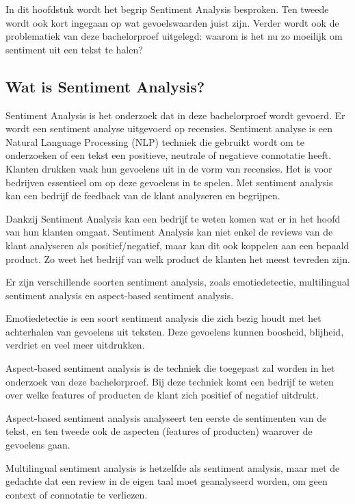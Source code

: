 In dit hoofdstuk wordt het begrip Sentiment Analysis besproken. Ten tweede wordt ook kort ingegaan op wat gevoelswaarden juist zijn. Verder wordt ook de problematiek van deze bachelorproef uitgelegd: waarom is het nu zo moeilijk om sentiment uit een tekst te halen?  

\subsection{Wat is Sentiment Analysis?}
\label{sec:watissentimentanalysis}

Sentiment Analysis is het onderzoek dat in deze bachelorproef wordt gevoerd. Er wordt een sentiment analyse uitgevoerd op recensies. Sentiment analyse is een Natural Language Processing (NLP) techniek die gebruikt wordt om te onderzoeken of een tekst een positieve, neutrale of negatieve connotatie heeft. Klanten drukken vaak hun gevoelens uit in de vorm van recensies. Het is voor bedrijven essentieel om op deze gevoelens in te spelen. Met sentiment analysis kan een bedrijf de feedback van de klant analyseren en begrijpen. \autocite{MonkeyLearn2021}
 
Dankzij Sentiment Analysis kan een bedrijf te weten komen wat er in het hoofd van hun klanten omgaat. Sentiment Analysis kan niet enkel de reviews van de klant analyseren als positief/negatief, maar kan dit ook koppelen aan een bepaald product. Zo weet het bedrijf van welk product de klanten het meest tevreden zijn. \autocite{MonkeyLearn2021}

Er zijn verschillende soorten sentiment analysis, zoals emotiedetectie, multilingual sentiment analysis en aspect-based sentiment analysis. 

Emotiedetectie is een soort sentiment analysis die zich bezig houdt met het achterhalen van gevoelens uit teksten. Deze gevoelens kunnen boosheid, blijheid, verdriet en veel meer uitdrukken. \autocite{MonkeyLearn2021}

Aspect-based sentiment analysis is de techniek die toegepast zal worden in het onderzoek van deze bachelorproef. Bij deze techniek komt een bedrijf te weten over welke features of producten de klant zich positief of negatief uitdrukt. \autocite{MonkeyLearn2021}

Aspect-based sentiment analysis analyseert ten eerste de sentimenten van de tekst, en ten tweede ook de aspecten (features of producten) waarover de gevoelens gaan.
 
Multilingual sentiment analysis is hetzelfde als sentiment analysis, maar met de gedachte dat een review in de eigen taal moet geanalyseerd worden, om geen context of connotatie te verliezen. \autocite{MonkeyLearn2021}

